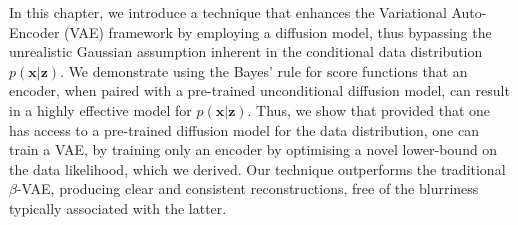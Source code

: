 In this chapter, we introduce a technique that enhances the Variational Auto-Encoder (VAE) framework by employing a diffusion model, thus bypassing the unrealistic Gaussian assumption inherent in the conditional data distribution $p(\textbf{x} | \textbf{z})$. We demonstrate using the Bayes' rule for score functions that an encoder, when paired with a pre-trained unconditional diffusion model, can result in a highly effective model for $p(\textbf{x}| \textbf{z})$. Thus, we show that  provided that one has access to a pre-trained diffusion model for the data distribution, one can train a VAE, by training only an encoder by optimising a novel lower-bound on the data likelihood, which we derived. Our technique outperforms the traditional $\beta$-VAE, producing clear and consistent reconstructions, free of the blurriness typically associated with the latter.